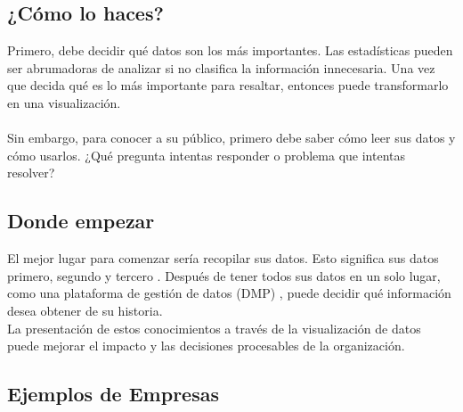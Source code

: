 \documentclass[preprint,12pt]{elsarticle}
\begin{document}
\subsection{¿Cómo lo haces?}	

Primero, debe decidir qué datos son los más importantes. Las estadísticas pueden ser abrumadoras de analizar si no clasifica la información innecesaria. Una vez que decida qué es lo más importante para resaltar, entonces puede transformarlo en una visualización.\\
\\
Sin embargo, para conocer a su público, primero debe saber cómo leer sus datos y cómo usarlos. ¿Qué pregunta intentas responder o problema que intentas resolver?\\

\subsection{Donde empezar}	

El mejor lugar para comenzar sería recopilar sus datos. Esto significa sus datos primero, segundo y tercero . Después de tener todos sus datos en un solo lugar, como una plataforma de gestión de datos (DMP) , puede decidir qué información desea obtener de su historia.\\

La presentación de estos conocimientos a través de la visualización de datos puede mejorar el impacto y las decisiones procesables de la organización.\\

\subsection{Ejemplos de Empresas}	
\end{document}
